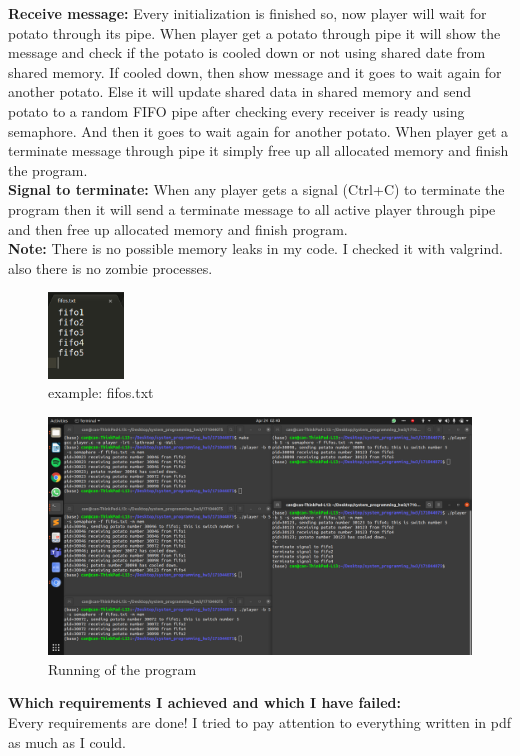 \documentclass[a4 paper]{article}
\begin{document}
\textbf{Receive message:} Every initialization is finished so, now player will wait for potato through its pipe. When player get a potato through pipe it will show the message and check if the potato is cooled down or not using shared date from shared memory. If cooled down, then show message and it goes to wait again for another potato. Else it will update shared data in shared memory and send potato to a random FIFO pipe after checking every receiver is ready using semaphore. And then it goes to wait again for another potato. When player get a terminate message through pipe it simply free up all allocated memory and finish the program.\newline\\
\textbf{Signal to terminate:} When any player gets a signal (Ctrl+C) to terminate the program then it will send a terminate message to all active player through pipe and then free up allocated memory and finish program.\newline\\
\textbf{Note:} There is no possible memory leaks in my code. I checked it with valgrind. also there is no zombie processes.\newline\\

\begin{figure}[ht!]
	\centering
	\includegraphics[width=20mm]{1.png}
	\caption{example: fifos.txt \label{overflow}}
\end{figure}

\begin{figure}[ht!]
	\centering
	\includegraphics[width=120mm]{2.png}
	\caption{Running of the program \label{overflow}}
\end{figure}



{\color{red}\large\textbf {Which requirements I achieved and which I have failed:}}\newline\\
\phantom{beta}Every requirements are done! I tried to pay attention to everything written in pdf as much as I could.\newline\\
\end{document}
